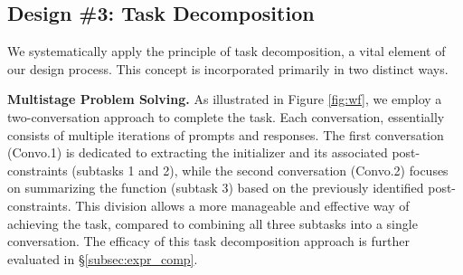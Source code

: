 






\subsection{Design \#3: Task Decomposition}
\label{subsec:multi-step}

We systematically apply the principle of task decomposition, a vital element of our design process. This concept is incorporated primarily in two distinct ways.

\vspace{3pt}
\noindent
\textbf{Multistage Problem Solving.} 
As illustrated in Figure \ref{fig:wf}, we employ a two-conversation approach to complete the task. Each conversation, essentially consists of multiple iterations of prompts and responses. The first conversation (Convo.1) is dedicated to extracting the initializer and its associated post-constraints (subtasks 1 and 2), while the second conversation (Convo.2) focuses on summarizing the function (subtask 3) based on the previously identified post-constraints. This division allows a more manageable and effective way of achieving the task, compared to combining all three subtasks into a single conversation. The efficacy of this task decomposition approach is further evaluated in \S\ref{subsec:expr_comp}.


